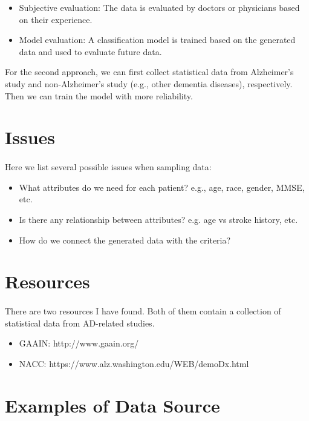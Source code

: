 \documentclass{article}
\begin{document}
\begin{itemize}
  \item Subjective evaluation: The data is evaluated by doctors or physicians based on their experience.
  \item Model evaluation: A classification model is trained based on the generated data and used to evaluate future data. 
\end{itemize}

For the second approach, we can first collect statistical data from Alzheimer's study and non-Alzheimer's study (e.g., other dementia diseases), respectively. Then we can train the model with more reliability.


\section{Issues}
\paragraph{}
Here we list several possible issues when sampling data:

\begin{itemize}
  \item What attributes do we need for each patient? e.g., age, race, gender, MMSE, etc.
  \item Is there any relationship between attributes?  e.g. age vs stroke history, etc.
  \item How do we connect the generated data with the criteria?
\end{itemize}


\section{Resources}
\paragraph{}
There are two resources I have found. Both of them contain a collection of statistical data from AD-related studies.

\begin{itemize}
  \item GAAIN: http://www.gaain.org/
  \item NACC: https://www.alz.washington.edu/WEB/demoDx.html
\end{itemize}

\section{Examples of Data Source}
\end{document}
